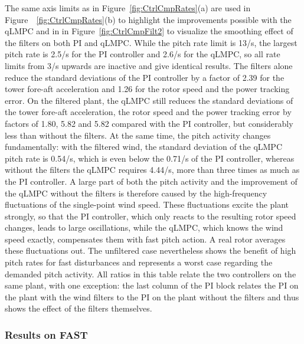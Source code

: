 The same axis limits as in Figure~\ref{fig:CtrlCmpRates}(a) are used in Figure~~\ref{fig:CtrlCmpRates}(b) to highlight the improvements possible with the qLMPC and in in Figure~\ref{fig:CtrlCmpFilt2} to visualize the smoothing effect of the filters on both PI and qLMPC. While the pitch rate limit is 13\textdegree/s, the largest pitch rate is 2.5\textdegree/s for the PI controller and 2.6\textdegree/s for the qLMPC, so all rate limits from 3\textdegree/s upwards are inactive and give identical results. The filters alone reduce the standard deviations of the PI controller by a factor of 2.39 for the tower fore-aft acceleration and 1.26 for the rotor speed and the power tracking error. On the filtered plant, the qLMPC still reduces the standard deviations of the tower fore-aft acceleration, the rotor speed and the power tracking error by factors of 1.80, 5.82 and 5.82 compared with the PI controller, but considerably less than without the filters. At the same time, the pitch activity changes fundamentally: with the filtered wind, the standard deviation of the qLMPC pitch rate is 0.54\textdegree/s, which is even below the 0.71\textdegree/s of the PI controller, whereas without the filters the qLMPC requires 4.44\textdegree/s, more than three times as much as the PI controller. A large part of both the pitch activity and the improvement of the qLMPC without the filters is therefore caused by the high-frequency fluctuations of the single-point wind speed. These fluctuations excite the plant strongly, so that the PI controller, which only reacts to the resulting rotor speed changes, leads to large oscillations, while the qLMPC, which knows the wind speed exactly, compensates them with fast pitch action. A real rotor averages these fluctuations out. The unfiltered case nevertheless shows the benefit of high pitch rates for fast disturbances and represents a worst case regarding the demanded pitch activity.
%
All ratios in this table relate the two controllers on the same plant, with one exception: the last column of the PI block relates the PI on the plant with the wind filters to the PI on the plant without the filters and thus shows the effect of the filters themselves.

\subsubsection{Results on FAST}\label{subsubsec:qLMPCFASTresults}

